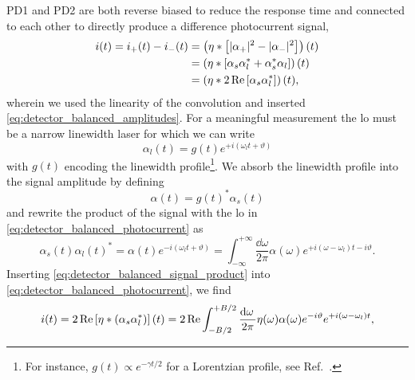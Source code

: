 PD1 and PD2 are both reverse biased to reduce the response time and connected to each other to directly produce a difference photocurrent signal,
\begin{equation}
	\begin{split}
		i(t)
		=
		i_+(t)
		-
		i_-(t)
		&=
		\left(
			\eta
			\ast
			\left[
				\lvert\alpha_+\rvert^2
				-
				\lvert\alpha_-\rvert^2
			\right]		
		\right)(t)
		\\
		&=
		\left(
			\eta
			\ast
			\left[
				\alpha_s
				\alpha_l^*
				+
				\alpha_s^*
				\alpha_l
			\right]
		\right)(t)
		\\
		&=
		\left(
			\eta
			\ast
			2\operatorname{Re}\left[
				\alpha_s
				\alpha_l^*
			\right]
		\right)(t)
		,
	\end{split}
	\label{eq:detector_balanced_photocurrent}
\end{equation}
wherein we used the linearity of the convolution and inserted \cref{eq:detector_balanced_amplitudes}.
For a meaningful measurement the \gls{lo} must be a narrow linewidth laser for which we can write
\begin{equation}
	\alpha_l(t)
	=
	g(t)
	e^{+i(\omega_lt+\vartheta)}
	\label{eq:detector_balanced_lo}
\end{equation}
with $g(t)$ encoding the linewidth profile\footnote{For instance, $g(t)\propto e^{-\gamma t/2}$ for a Lorentzian profile, see Ref.~\cite{Demtroeder2014}.}.
We absorb the linewidth profile into the signal amplitude by defining
\begin{equation}
	\alpha(t)
	=
	g(t)^*
	\alpha_s(t)
\end{equation}
and rewrite the product of the signal with the \gls{lo} in \cref{eq:detector_balanced_photocurrent} as
\begin{equation}
	\alpha_s(t)
	\alpha_l(t)^*
	=
	\alpha(t)
	e^{-i(\omega_lt+\vartheta)}
	=
	\int_{-\infty}^{+\infty}
	\frac{\dd{\omega}}{2\pi}
	\alpha(\omega)
	e^{+i(\omega-\omega_l)t-i\vartheta}
	.
	\label{eq:detector_balanced_signal_product}
\end{equation}
Inserting \cref{eq:detector_balanced_signal_product} into \cref{eq:detector_balanced_photocurrent}, we find
\begin{equation}
	\begin{split}
		i(t)
		=
		2\Re\left[
			\eta
			\conv
			(\alpha_s\alpha_l^*)
		\right](t)
		=
		2\Re
		\int_{-B/2}^{+B/2}
		\frac{\dd{\omega}}{2\pi}
		\eta(\omega)
		\alpha(\omega)
		e^{-i\vartheta}
		e^{+i(\omega-\omega_l) t}
		,
	\end{split}
	\label{eq:detector_balanced_photocurrent_final}
\end{equation}
